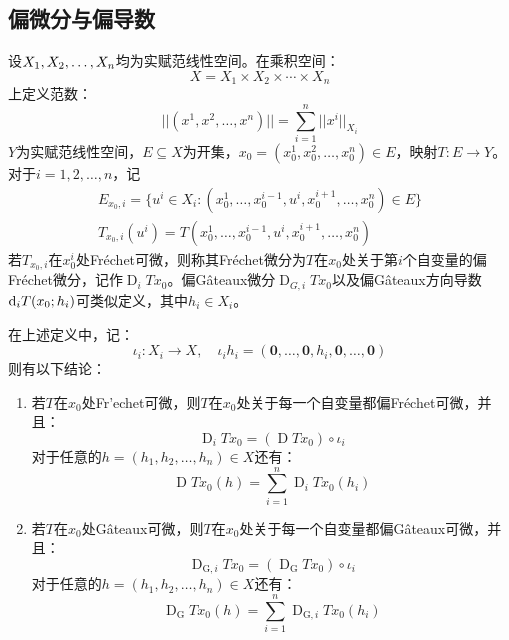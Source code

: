 \subsection{偏微分与偏导数}
\begin{definition}
	设$X_1, X_2, \dots, X_{n}$均为实赋范线性空间。在乘积空间：
	\begin{equation*}
		X=X_1\times X_2\times\cdots\times X_n
	\end{equation*}
	上定义范数：
	\begin{equation*}
		||(x^1,x^2,\dots,x^n)||=\sum_{i=1}^{n}||x^i||_{X_i}
	\end{equation*}
	$Y$为实赋范线性空间，$E\subseteq X$为开集，$x_0=(x_0^1,x_0^2,\dots,x_0^n)\in E$，映射$T:E\to Y$。对于$i=1,2,\dots,n$，记
	\begin{gather*}
		E_{x_0,i}=\{u^i\in X_i:(x_0^1,\dots,x_0^{i-1},u^i,x_0^{i+1},\dots,x_0^n)\in E\} \\
		T_{x_0,i}(u^i)=T(x_0^1,\dots,x_0^{i-1},u^i,x_0^{i+1},\dots,x_0^n)
	\end{gather*}
	若$T_{x_0,i}$在$x_0^i$处Fr\'echet可微，则称其Fr\'echet微分为$T$在$x_0$处关于第$i$个自变量的偏Fr\'echet微分，记作$\operatorname{D}_iTx_0$。偏G\^ateaux微分$\operatorname{D}_{G,i}Tx_0$以及偏G\^ateaux方向导数$\mathop{}\!\mathrm{d}_iT(x_0;h_i)$可类似定义，其中$h_i\in X_i$。
\end{definition}
\begin{property}\label{prop:PartialDifferential}
	在上述定义中，记：
	\begin{equation*}
		\iota_i:X_i\to X,\quad\iota_ih_i=(\mathbf{0},\dots,\mathbf{0},h_i,\mathbf{0},\dots,\mathbf{0})
	\end{equation*}
	则有以下结论：
	\begin{enumerate}
		\item 若$T$在$x_0$处Fr'echet可微，则$T$在$x_0$处关于每一个自变量都偏Fr\'echet可微，并且：
		\begin{equation*}
			\operatorname{D}_iTx_0=(\operatorname{D}Tx_0)\circ\iota_i
		\end{equation*}
		对于任意的$h=(h_1,h_2,\dots,h_n)\in X$还有：
		\begin{equation*}
			\operatorname{D}Tx_0(h)=\sum_{i=1}^{n}\operatorname{D}_iTx_0(h_i)
		\end{equation*}
		\item 若$T$在$x_0$处G\^ateaux可微，则$T$在$x_0$处关于每一个自变量都偏G\^ateaux可微，并且：
		\begin{equation*}
			\operatorname{D}_{\mathrm{G},i}Tx_0=(\operatorname{D}_{\mathrm{G}}Tx_0)\circ\iota_i
		\end{equation*}
		对于任意的$h=(h_1,h_2,\dots,h_n)\in X$还有：
		\begin{equation*}
			\operatorname{D}_{\mathrm{G}}Tx_0(h)=\sum_{i=1}^{n}\operatorname{D}_{\mathrm{G},i}Tx_0(h_i)
		\end{equation*}
	\end{enumerate}
\end{property}
